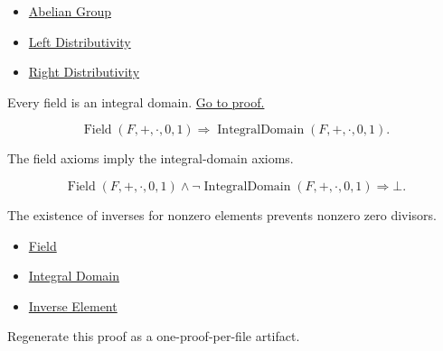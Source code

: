 \begin{dependencies}
\begin{itemize}
  \item \hyperref[def:algebraic-abelian-group]{Abelian Group}
  \item \hyperref[def:algebraic-left-distributivity]{Left Distributivity}
  \item \hyperref[def:algebraic-right-distributivity]{Right Distributivity}
\end{itemize}
\end{dependencies}

\begin{proposition}
\label{prop:abstract-field-is-domain}
Every field is an integral domain.
\hyperref[prf:field-is-domain]{Go to proof.}
\end{proposition}

\begin{remark*}
\[
\operatorname{Field}(F,+,\cdot,0,1)
\Longrightarrow
\operatorname{IntegralDomain}(F,+,\cdot,0,1).
\]
\end{remark*}

\begin{remark*}
The field axioms imply the integral-domain axioms.
\end{remark*}

\begin{remark*}
\[
\operatorname{Field}(F,+,\cdot,0,1)
\land
\neg\operatorname{IntegralDomain}(F,+,\cdot,0,1)
\Longrightarrow \bot.
\]
\end{remark*}

\begin{remark*}[Interpretation]
The existence of inverses for nonzero elements prevents nonzero zero divisors.
\end{remark*}

\begin{dependencies}
\begin{itemize}
  \item \hyperref[def:algebraic-field]{Field}
  \item \hyperref[def:algebraic-integral-domain]{Integral Domain}
  \item \hyperref[def:inverse-element]{Inverse Element}
\end{itemize}
\end{dependencies}

\begin{remark*}
Regenerate this proof as a one-proof-per-file artifact.
\end{remark*}

